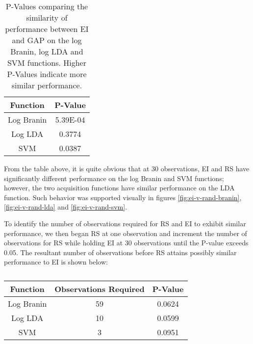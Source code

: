 \documentclass[11pt]{article}
\numberwithin{equation}{section}
\begin{document}
\begin{table}[H]
  \centering
  \begin{tabular}{| c | c |}
    \hline
    Function & P-Value  \\
    \hline
    Log Branin   & 5.39E-04 \\
    \hline
    Log LDA      & 0.3774   \\
    \hline
    SVM      & 0.0387   \\
    \hline
  \end{tabular}
  \caption{P-Values comparing the similarity of performance between EI and GAP on the log Branin, log LDA and SVM functions. Higher P-Values indicate more similar performance.}
  \label{tab:ei-rs-pvals}
\end{table}

From the table above, it is quite obvious that at 30 observations, EI and RS have significantly different performance on the log Branin and SVM functions; however, the two acquisition functions have similar performance on the LDA function. Such behavior was supported visually in figures \ref{fig:ei-v-rand-branin}, \ref{fig:ei-v-rand-lda} and \ref{fig:ei-v-rand-svm}.

To identify the number of observations required for RS and EI to exhibit similar performance, we then began RS at one observation and increment the number of observations for RS while holding EI at 30 observations until the P-value exceeds 0.05. The resultant number of observations before RS attains possibly similar performance to EI is shown below:

\begin{table}[H]
  \centering
  \begin{tabular}{| c | c | c |}
    \hline
    Function & Observations Required & P-Value \\
    \hline
    Log Branin & 59 & 0.0624 \\
    \hline
    Log LDA & 10 & 0.0599 \\
    \hline
    SVM & 3 & 0.0951 \\
    \hline
  \end{tabular}
  \caption{}
  \label{tab:ei-rs-pvals-to-equivalence}
\end{table}
\end{document}
